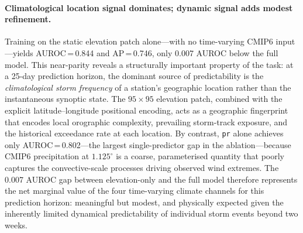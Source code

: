 \documentclass{article}
\begin{document}
\paragraph{Climatological location signal dominates; dynamic signal adds modest refinement.}
Training on the static elevation patch alone---with no time-varying CMIP6 input---yields AUROC\,=\,0.844 and AP\,=\,0.746, only 0.007 AUROC below the full model. This near-parity reveals a structurally important property of the task: at a 25-day prediction horizon, the dominant source of predictability is the \emph{climatological storm frequency} of a station's geographic location rather than the instantaneous synoptic state. The $95{\times}95$ elevation patch, combined with the explicit latitude--longitude positional encoding, acts as a geographic fingerprint that encodes local orographic complexity, prevailing storm-track exposure, and the historical exceedance rate at each location. By contrast, \texttt{pr} alone achieves only AUROC\,=\,0.802---the largest single-predictor gap in the ablation---because CMIP6 precipitation at $1.125^\circ$ is a coarse, parameterised quantity that poorly captures the convective-scale processes driving observed wind extremes. The 0.007 AUROC gap between elevation-only and the full model therefore represents the net marginal value of the four time-varying climate channels for this prediction horizon: meaningful but modest, and physically expected given the inherently limited dynamical predictability of individual storm events beyond two weeks.
\end{document}
